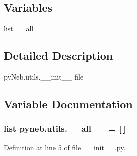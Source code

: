 \subsection*{Variables}
\begin{DoxyCompactItemize}
\item 
list \hyperlink{namespacepyneb_1_1utils_a4cbc363c80d46a33717a18a0b4fcd281}{\+\_\+\+\_\+all\+\_\+\+\_\+} = \mbox{[}$\,$\mbox{]}
\end{DoxyCompactItemize}


\subsection{Detailed Description}
\begin{DoxyVerb}pyNeb.utils.__init__ file
\end{DoxyVerb}
 

\subsection{Variable Documentation}
\hypertarget{namespacepyneb_1_1utils_a4cbc363c80d46a33717a18a0b4fcd281}{}
\subsubsection[{\+\_\+\+\_\+all\+\_\+\+\_\+}]{\setlength{\rightskip}{0pt plus 5cm}list pyneb.\+utils.\+\_\+\+\_\+all\+\_\+\+\_\+ = \mbox{[}$\,$\mbox{]}}\label{namespacepyneb_1_1utils_a4cbc363c80d46a33717a18a0b4fcd281}


Definition at line \hyperlink{utils_2____init_____8py_source_l00005}{5} of file \hyperlink{utils_2____init_____8py_source}{\+\_\+\+\_\+init\+\_\+\+\_\+.\+py}.

